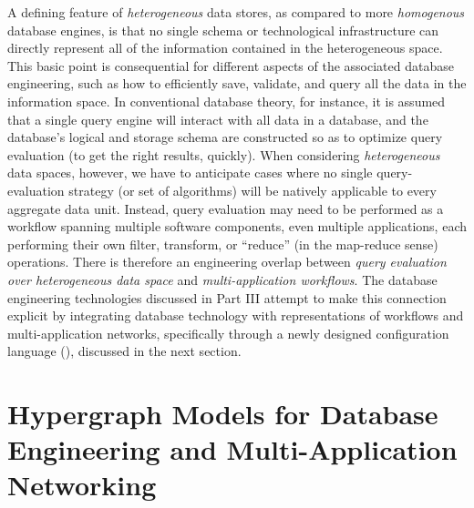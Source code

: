 \documentclass[11pt,letterpaper]{article}
\let\OldPart\part
\renewcommand{\part}[1]{\OldPart{#1}\vspace{-1.5em}}
\newcommand{\ATextCClr}[1]{\textcolor{atcColor}{\textbf{#1}}}
\newcommand{\HMCL}{{\resizebox{!}{7.5pt}{\ATextCClr{HMCL}}}}
\newcommand{\p}[1]{

\vspace{1em}#1}
\newcommand{\q}[1]{{\fontfamily{qcr}\selectfont ``}#1{\fontfamily{qcr}\selectfont ''}}
\begin{document}
{\p{A defining feature of \textit{heterogeneous} 
data stores, as compared to more \textit{homogenous} 
database engines, is that no single schema or 
technological infrastructure can directly 
represent all of the information contained 
in the heterogeneous space.  This basic 
point is consequential for different aspects 
of the associated database engineering, such as 
how to efficiently save, validate, and query 
all the data in the information space.  
In conventional database theory, for instance, 
it is assumed that a single query engine 
will interact with all data in a database, 
and the database's logical and storage 
schema are constructed so as to optimize 
query evaluation (to get the right results, 
quickly).  When considering 
\textit{heterogeneous} data spaces, however, 
we have to anticipate cases where no 
single query-evaluation strategy 
(or set of algorithms) will be natively 
applicable to every aggregate data unit.  
Instead, query evaluation may need to 
be performed as a workflow spanning 
multiple software components, even multiple 
applications, each performing their 
own filter, transform, or \q{reduce} 
(in the map-reduce sense) operations. 
There is therefore an engineering overlap 
between \textit{query evaluation over 
heterogeneous data space} and 
\textit{multi-application workflows}.  
The database engineering technologies 
discussed in Part III attempt to 
make this connection explicit by 
integrating database technology with 
representations of workflows and 
multi-application networks, 
specifically through a newly 
designed configuration language 
(\HMCL{}), discussed in the next section.}


\part{Hypergraph Models for Database Engineering and 
Multi-Application Networking}

}
\end{document}
